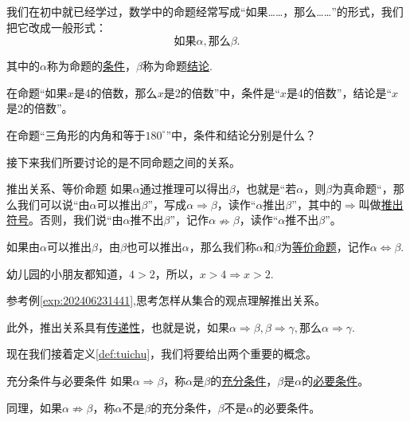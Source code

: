 \documentclass[lang=cn,math=cm,chinesefont=nofont,11pt,scheme=chinese,onecol]{elegantbook}
\begin{document}
我们在初中就已经学过，数学中的命题经常写成“如果……，那么……”的形式，我们把它改成一般形式：
$$\text{如果}\alpha ,\text{那么}\beta.$$

其中的$\alpha$称为命题的\underline{条件}，$\beta$称为命题\underline{结论}.

\begin{example}
  在命题“如果$x$是4的倍数，那么$x$是2的倍数”中，条件是“$x$是4的倍数”，结论是“$x$是2的倍数”。
\end{example}

\begin{exercise}
  在命题“三角形的内角和等于$180^{\circ}$”中，条件和结论分别是什么？
\end{exercise}

\hspace*{\fill}

接下来我们所要讨论的是不同命题之间的关系。

\begin{definition}{推出关系、等价命题}\label{def:tuichu}
  如果$\alpha$通过推理可以得出$\beta$，也就是“若$\alpha$，则$\beta$为真命题“，那么我们可以说“由$\alpha$可以推出$\beta$”，写成$\alpha\Rightarrow\beta$，读作“$\alpha$推出$\beta$”，其中的$\Rightarrow$叫做\underline{推出符号}。否则，我们说“由$\alpha$推不出$\beta$”，记作$\alpha\nRightarrow\beta$，读作“$\alpha$推不出$\beta$”。

  如果由$\alpha$可以推出$\beta$，由$\beta$也可以推出$\alpha$，那么我们称$\alpha$和$\beta$为\underline{等价命题}，记作$\alpha\Leftrightarrow\beta$.
\end{definition}

\begin{example}\label{exp:202406231441}
  幼儿园的小朋友都知道，$4>2$，所以，$x>4\Rightarrow x>2$.
\end{example}

\begin{exercise}\label{202406262000}
  参考例\ref{exp:202406231441},思考怎样从集合的观点理解推出关系。
\end{exercise}

此外，推出关系具有\underline{传递性}，也就是说，如果$\alpha\Rightarrow\beta,\beta\Rightarrow\gamma,$那么$\alpha\Rightarrow\gamma$.

\hspace*{\fill}

现在我们接着定义\ref{def:tuichu}，我们将要给出两个重要的概念。

\begin{definition}{充分条件与必要条件}
  如果$\alpha\Rightarrow\beta$，称$\alpha$是$\beta$的\underline{充分条件}，$\beta$是$\alpha$的\underline{必要条件}。

  同理，如果$\alpha\nRightarrow\beta$，称$\alpha$不是$\beta$的充分条件，$\beta$不是$\alpha$的必要条件。
\end{definition}
\end{document}
